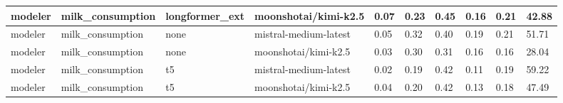 \begin{tabular}{|l|l|l|l|l|l|l|l|l|l|}
 \hline
 modeler & milk\_consumption & longformer\_ext & moonshotai/kimi-k2.5 & 0.07 & 0.23 & 0.45 & 0.16 & 0.21 & 42.88 \\
 \hline
 modeler & milk\_consumption & none & mistral-medium-latest & 0.05 & 0.32 & 0.40 & 0.19 & 0.21 & 51.71 \\
 \hline
 modeler & milk\_consumption & none & moonshotai/kimi-k2.5 & 0.03 & 0.30 & 0.31 & 0.16 & 0.16 & 28.04 \\
 \hline
 modeler & milk\_consumption & t5 & mistral-medium-latest & 0.02 & 0.19 & 0.42 & 0.11 & 0.19 & 59.22 \\
 \hline
 modeler & milk\_consumption & t5 & moonshotai/kimi-k2.5 & 0.04 & 0.20 & 0.42 & 0.13 & 0.18 & 47.49 \\
\hline
\end{tabular}
